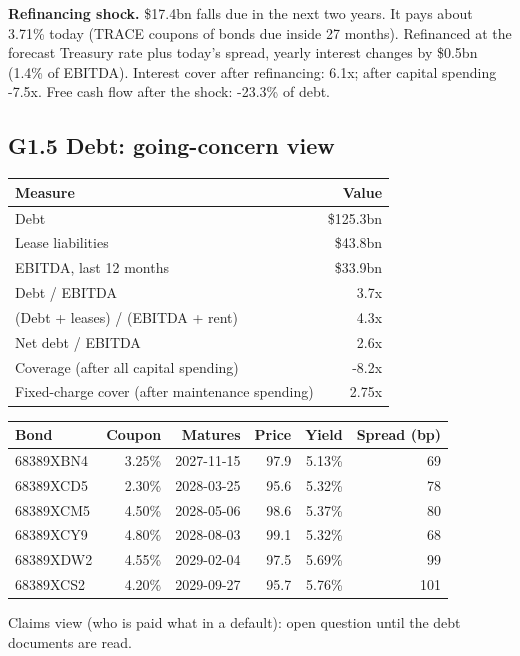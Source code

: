 \documentclass[11pt,a4paper]{article}
\begin{document}
\textbf{Refinancing shock.} \$17.4bn falls due in the next two years. It pays about 3.71\% today (TRACE coupons of bonds due inside 27 months). Refinanced at the forecast Treasury rate plus today's spread, yearly interest changes by \$0.5bn (1.4\% of EBITDA). Interest cover after refinancing: 6.1x; after capital spending -7.5x. Free cash flow after the shock: -23.3\% of debt.
\subsection*{G1.5 Debt: going-concern view}
\begin{center}\footnotesize\setlength{\tabcolsep}{3.5pt}\begin{tabular}{@{}lr@{}}\toprule
Measure & Value \\\midrule
Debt & \$125.3bn \\
Lease liabilities & \$43.8bn \\
EBITDA, last 12 months & \$33.9bn \\
Debt / EBITDA & 3.7x \\
(Debt + leases) / (EBITDA + rent) & 4.3x \\
Net debt / EBITDA & 2.6x \\
Coverage (after all capital spending) & -8.2x \\
Fixed-charge cover (after maintenance spending) & 2.75x \\
\bottomrule\end{tabular}\end{center}
\begin{center}\footnotesize\setlength{\tabcolsep}{3.5pt}\begin{tabular}{@{}lrrrrr@{}}\toprule
Bond & Coupon & Matures & Price & Yield & Spread (bp) \\\midrule
68389XBN4 & 3.25\% & 2027-11-15 & 97.9 & 5.13\% & 69 \\
68389XCD5 & 2.30\% & 2028-03-25 & 95.6 & 5.32\% & 78 \\
68389XCM5 & 4.50\% & 2028-05-06 & 98.6 & 5.37\% & 80 \\
68389XCY9 & 4.80\% & 2028-08-03 & 99.1 & 5.32\% & 68 \\
68389XDW2 & 4.55\% & 2029-02-04 & 97.5 & 5.69\% & 99 \\
68389XCS2 & 4.20\% & 2029-09-27 & 95.7 & 5.76\% & 101 \\
\bottomrule\end{tabular}\end{center}
Claims view (who is paid what in a default): open question until the debt documents are read.
\end{document}

